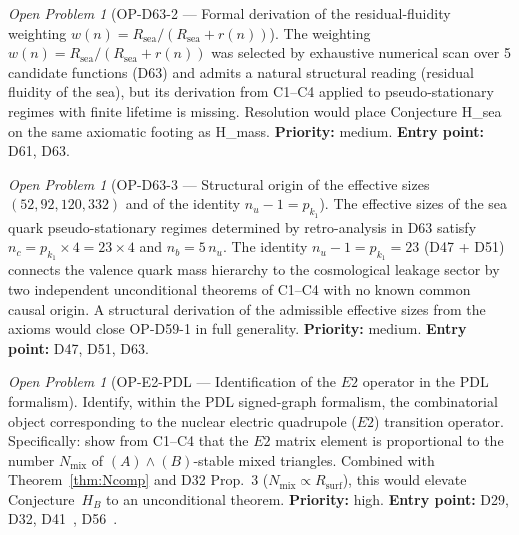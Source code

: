 \documentclass[11pt,a4paper]{article}
\theoremstyle{plain}
\theoremstyle{definition}
\theoremstyle{remark}
\newtheorem{openproblem}[theorem]{Open Problem}
\begin{document}
\begin{openproblem}[OP-D63-2 --- Formal derivation of the residual-fluidity weighting $w(n) = R_{\mathrm{sea}}/(R_{\mathrm{sea}}+r(n))$]
\label{op:D63two}
The weighting $w(n) = R_{\mathrm{sea}}/(R_{\mathrm{sea}}+r(n))$ was selected by exhaustive numerical scan over 5 candidate functions (D63) and admits a natural structural reading (residual fluidity of the sea), but its derivation from C1--C4 applied to pseudo-stationary regimes with finite lifetime is missing. Resolution would place Conjecture H\_sea on the same axiomatic footing as H\_mass. \textbf{Priority:} medium. \textbf{Entry point:} D61, D63.
\end{openproblem}

\begin{openproblem}[OP-D63-3 --- Structural origin of the effective sizes $(52, 92, 120, 332)$ and of the identity $n_u - 1 = p_{k_1}$]
\label{op:D63three}
The effective sizes of the sea quark pseudo-stationary regimes determined by retro-analysis in D63 satisfy $n_c = p_{k_1}\times 4 = 23\times 4$ and $n_b = 5\,n_u$. The identity $n_u - 1 = p_{k_1} = 23$ (D47 + D51) connects the valence quark mass hierarchy to the cosmological leakage sector by two independent unconditional theorems of C1--C4 with no known common causal origin. A structural derivation of the admissible effective sizes from the axioms would close OP-D59-1 in full generality. \textbf{Priority:} medium. \textbf{Entry point:} D47, D51, D63.
\end{openproblem}

\begin{openproblem}[OP-E2-PDL --- Identification of the $E2$ operator in the PDL formalism]
\label{op:E2PDL}
Identify, within the PDL signed-graph formalism, the combinatorial object corresponding to the nuclear electric quadrupole ($E2$) transition operator. Specifically: show from C1--C4 that the $E2$ matrix element is proportional to the number $N_{\mathrm{mix}}$ of $(A)\wedge(B)$-stable mixed triangles. Combined with Theorem~\ref{thm:Ncomp} and D32 Prop.~3 ($N_{\mathrm{mix}}\propto R_{\mathrm{surf}}$), this would elevate Conjecture~$H_B$ to an unconditional theorem. \textbf{Priority:} high. \textbf{Entry point:} D29, D32, D41~\cite{D41}, D56~\cite{D56}.
\end{openproblem}
\end{document}
